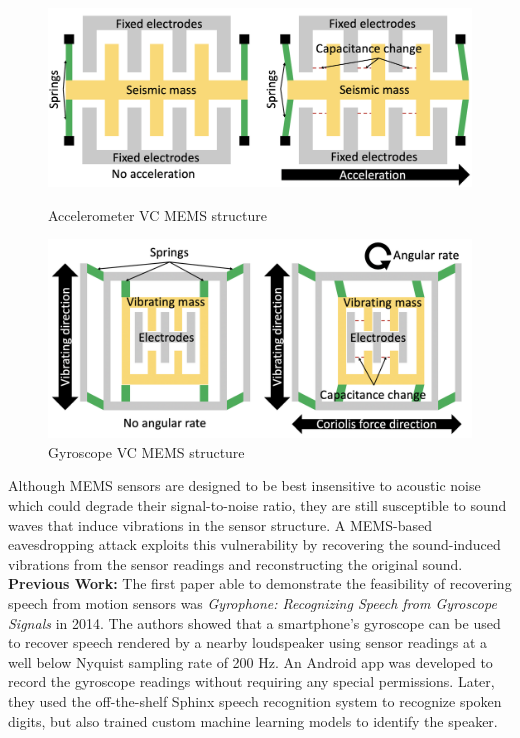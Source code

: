 \documentclass[sigconf, nonacm]{acmart}
\begin{document}
\begin{figure}[H]
  \centering
  \includegraphics[width=\linewidth]{embed/MEMS_accelerometer.png}
  \caption{Accelerometer VC MEMS structure \cite{AccelEve2020}}
  \label{fig:MEMS_accelerometer}

  \vspace{0.25cm}

  \includegraphics[width=\linewidth]{embed/MEMS_gyroscope.png}
  \caption{Gyroscope VC MEMS structure \cite{AccelEve2020}}
  \label{fig:MEMS_gyroscope}
\end{figure}

Although MEMS sensors are designed to be best insensitive to acoustic noise which could degrade their signal-to-noise ratio, they are still susceptible to sound waves that induce vibrations in the sensor structure.
A MEMS-based eavesdropping attack exploits this vulnerability by recovering the sound-induced vibrations from the sensor readings and reconstructing the original sound.
\\[6pt]
\textbf{Previous Work:} The first paper able to demonstrate the feasibility of recovering speech from motion sensors was \textit{Gyrophone: Recognizing Speech from Gyroscope Signals} \cite{Gyrophone2014} in 2014.
The authors showed that a smartphone's gyroscope can be used to recover speech rendered by a nearby loudspeaker using sensor readings at a well below Nyquist sampling rate of 200 Hz.
An Android app was developed to record the gyroscope readings without requiring any special permissions.
Later, they used the off-the-shelf Sphinx speech recognition system to recognize spoken digits, but also trained custom machine learning models to identify the speaker.
\end{document}
